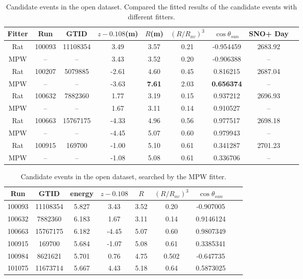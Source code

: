 \begin{table}[ht]
	\centering
	\caption{Candidate events in the open dataset. Compared the fitted results of the candidate events with different fitters.}
	\label{opendata}
	\begin{tabular*}{150mm}{c@{\extracolsep{\fill}}cccccccc}
		\toprule
	 Fitter &	Run &  GTID &  $z-0.108$(m) & $R$(m)& $(R/R_{av})^3$ & $\cos\theta_{sun}$ & SNO+ Day\\
		\hline 
	Rat & 100093 &11108354 &3.49 &3.57 &0.21 &-0.954459 &2683.92 \\	
	MPW &  --& --& 3.43 &	3.52 &	0.20	& -0.906388 & --\\
	Rat &	100207 &5079885 &-2.61 &4.60 &0.45 &0.816215 &2687.04\\
	MPW &	 --& --& -3.63 & \textbf{7.61} &	2.03 & \textbf{0.656374} & -- \\
	Rat &100632 &7882360 &1.77 &3.19 &0.15 &0.937212 &2696.93\\
	 MPW &    --& --&  1.67 & 3.11 &	0.14 & 0.910527 & -- \\
	Rat &100663 &15767175 &-4.33& 4.96 &0.56 &0.977517 &2698.18\\
	MPW & --& -- &-4.45 &	5.07 &	0.60 &	0.979943 & -- \\
	Rat &100915 &169700 &-1.00 &5.10 &0.61 &0.341287 &2701.23\\
	MPW &	--& --& -1.08 &	5.08 &	0.61 &	0.336706 & -- \\	
		\bottomrule
	\end{tabular*}
\end{table}


\begin{table}[ht]
	\centering
	\caption{Candidate events in the open dataset, searched by the MPW fitter.}
	\label{opendataMPW}
	\begin{tabular*}{150mm}{c@{\extracolsep{\fill}}cccccccc}
		\toprule
		Run & GTID & energy & $z-0.108$ & $R$ & $(R/R_{av})^3$ & $\cos\theta_{sun}$\\
		\hline 
100093 &	11108354	&5.827 & 3.43 & 3.52 & 0.20 & -0.907005\\
100632&	7882360    &6.183& 1.67 &3.11 &0.14 &0.9146124\\
100663&	15767175   &	6.182 & -4.45 &5.07 &0.60&	0.9807349\\
100915&	169700   &	5.684 &	-1.07 &5.08 &0.61&0.3385341\\
100984&	8621621&	5.701 & 0.76 &4.75 &0.502&-0.647735\\
101075&	11673714&	5.667 &4.43 &5.18 &0.64& 0.5873025\\

		\bottomrule
\end{tabular*}
\end{table}

